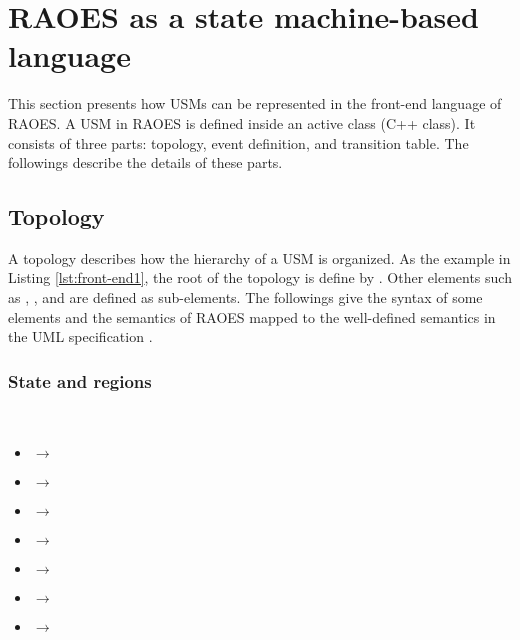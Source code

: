 \section{RAOES as a state machine-based language}
\label{sec:syntax}
This section presents how USMs can be represented in the front-end language of RAOES.
A USM in RAOES is defined inside an active class (C++ class).
It consists of three parts: topology, event definition, and transition table.
The followings describe the details of these parts.
\subsection{Topology}
A topology describes how the hierarchy of a USM is organized.
As the example in Listing \ref{lst:front-end1}, the root of the topology is define by .
Other elements such as , , and  are defined as sub-elements.
The followings give the syntax of some elements and the semantics of RAOES mapped to the well-defined semantics in the UML specification \cite{OMG2015}.

\subsubsection{State and regions} ~\\
\begin{itemize}[\footnotesize]
\item {} $\rightarrow$  

\item {} $\rightarrow$  

\item {} $\rightarrow$ 

\item {} $\rightarrow$  

\item {} $\rightarrow$ 

\item {} $\rightarrow$ 

\item {} $\rightarrow$ 
\end{itemize}

